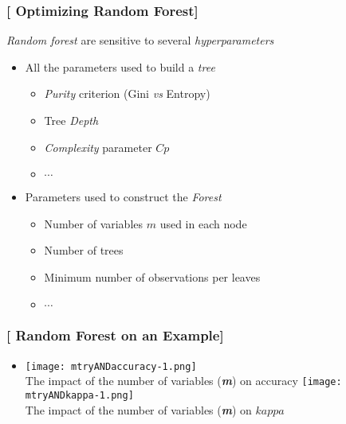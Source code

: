 \documentclass[xcolor=x11names,compress, handhouts]{beamer}
\renewcommand{\(}{\begin{columns}}
\renewcommand{\)}{\end{columns}}
\newcommand{\<}[1]{\begin{column}{#1}}
\renewcommand{\>}{\end{column}}
\begin{document}
\begin{frame}
\frametitle{\textcolor{brique}{[ Optimizing Random Forest]}}
\textit{Random forest} are sensitive to several \textit{hyperparameters}
\pause
\begin{itemize}[<+->]
    \item All the parameters used to build a \textit{tree}
    \begin{itemize}[<+->]
        \item \textit{Purity} criterion (Gini \textit{vs} Entropy)
        \item Tree \textit{Depth} 
        \item \textit{Complexity} parameter $Cp$
        \item $\cdots$
    \end{itemize}
    \item Parameters used to construct the \textit{Forest}
    \begin{itemize}[<+->]
        \item Number of variables $m$  used in each node
        \item Number of trees 
        \item Minimum number of observations per leaves
        \item $\cdots$
    \end{itemize}
\end{itemize}
\end{frame}


\begin{frame}
\frametitle{\textcolor{brique}{[ Random Forest on an Example]}}
\pause
\begin{itemize}
\item[]
    {\texttt{[image: mtryANDaccuracy-1.png]}\\  }
    {The impact of the number of variables (\textbf{\textit{m}}) on accuracy}
    {\texttt{[image: mtryANDkappa-1.png]}\\ }
    {The impact of the number of variables (\textbf{\textit{m}}) on $kappa$ }
\end{itemize}
\end{frame}
\end{document}
